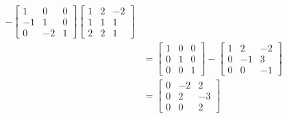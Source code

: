 \documentclass[11pt, letterpaper]{article}
\begin{document}
\begin{align*}
    -
    \begin{bmatrix}
        1 & 0 & 0\\
        -1 & 1 & 0\\
        0 & -2 & 1 
    \end{bmatrix}
    \begin{bmatrix}
        1 & 2 & -2\\
        1 & 1 & 1\\
        2 & 2 & 1
    \end{bmatrix}\\
    &=
    \begin{bmatrix}
        1 & 0 & 0 \\
        0 & 1 & 0\\
        0 & 0 & 1
    \end{bmatrix}
    -
    \begin{bmatrix}
        1 & 2 & -2\\
        0 & -1 & 3\\
        0 & 0 & -1
    \end{bmatrix}\\
    &=
    \begin{bmatrix}
        0 & -2 & 2\\
        0 & 2 & -3\\
        0 & 0 & 2
    \end{bmatrix}
\end{align*}
\end{document}
